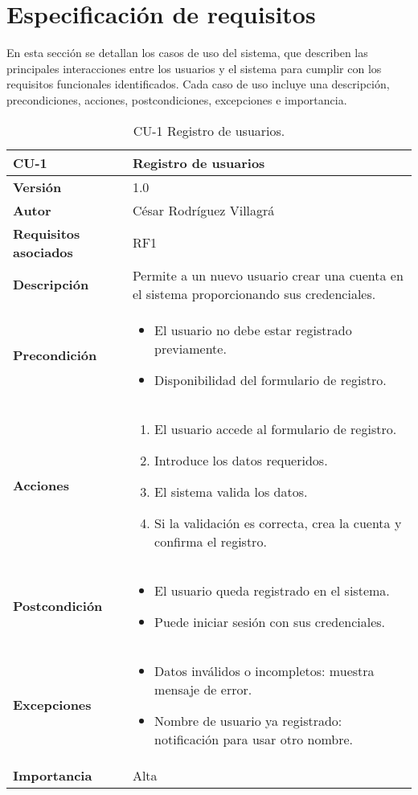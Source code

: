 \section{Especificación de requisitos}
En esta sección se detallan los casos de uso del sistema, que describen las principales interacciones entre los usuarios y el sistema para cumplir con los requisitos funcionales identificados. Cada caso de uso incluye una descripción, precondiciones, acciones, postcondiciones, excepciones e importancia.

\begin{table}[p]
	\centering
	\begin{tabularx}{\linewidth}{ p{} p{} }
		\toprule
		\textbf{CU-1}    & \textbf{Registro de usuarios} \\
		\toprule
		\textbf{Versión}              & 1.0    \\
		\textbf{Autor}                & César Rodríguez Villagrá \\
		\textbf{Requisitos asociados} & RF1 \\
		\textbf{Descripción}          & Permite a un nuevo usuario crear una cuenta en el sistema proporcionando sus credenciales. \\
		\textbf{Precondición}         & 
		\begin{itemize}
			\item El usuario no debe estar registrado previamente.
			\item Disponibilidad del formulario de registro.
		\end{itemize} \\
		\textbf{Acciones}             & 
		\begin{enumerate}
			\item El usuario accede al formulario de registro.
			\item Introduce los datos requeridos.
			\item El sistema valida los datos.
			\item Si la validación es correcta, crea la cuenta y confirma el registro.
		\end{enumerate} \\
		\textbf{Postcondición}        & 
		\begin{itemize}
			\item El usuario queda registrado en el sistema.
			\item Puede iniciar sesión con sus credenciales.
		\end{itemize} \\
		\textbf{Excepciones}          & 
		\begin{itemize}
			\item Datos inválidos o incompletos: muestra mensaje de error.
			\item Nombre de usuario ya registrado: notificación para usar otro nombre.
		\end{itemize} \\
		\textbf{Importancia}          & Alta \\
		\bottomrule
	\end{tabularx}
	\caption{CU-1 Registro de usuarios.}
\end{table}


